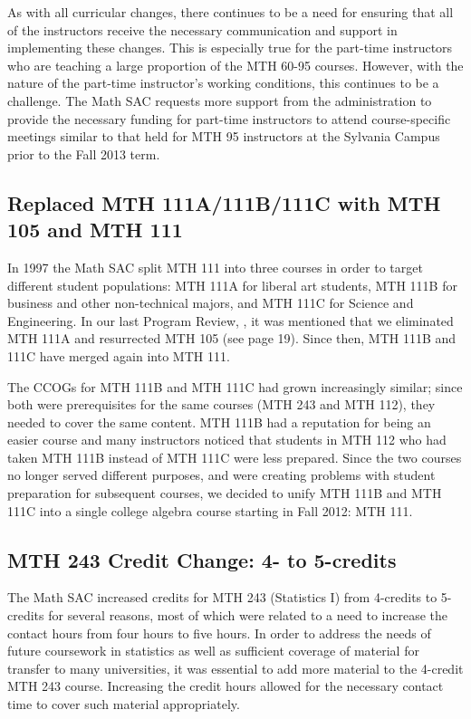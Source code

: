 As with all curricular changes, there continues to be a need for ensuring that
all of the instructors receive the necessary communication and support in
implementing these changes.  This is especially true for the part-time
instructors who are teaching a large proportion of the MTH 60-95 courses.  However,
with the nature of the part-time instructor's working conditions, this continues
to be a challenge.  The Math SAC requests more support from the administration
to provide the necessary funding for part-time instructors to attend
course-specific meetings similar to that held for MTH 95 instructors at the
Sylvania Campus prior to the Fall 2013 term.
 
\subsection{Replaced MTH 111A/111B/111C with MTH 105 and MTH 111}
In 1997 the Math SAC split MTH 111 into three courses in order to target
different student populations: MTH 111A for liberal art students, MTH 111B for
business and other non-technical majors, and MTH 111C for Science and
Engineering.  In our last Program Review, \cite{mathprogramreview2003}, 
it was mentioned that we eliminated MTH 111A and resurrected MTH 105 (see \cite{mathprogramreview2003} page 19).  
Since then, MTH 111B and 111C have merged again into MTH 111.  

The CCOGs for MTH 111B and MTH 111C had grown
increasingly similar; since both were prerequisites for the same courses
(MTH 243 and MTH 112), they needed to cover the same content.  MTH 111B had a
reputation for being an easier course and many instructors noticed that students
in MTH 112 who had taken MTH 111B instead of MTH 111C were less prepared.  Since
the two courses no longer served different purposes, and were creating problems 
with student preparation for subsequent courses, we decided to unify MTH 111B and MTH 111C into a single
college algebra course starting in Fall 2012: MTH 111.
 
\subsection{MTH 243 Credit Change: 4- to 5-credits}\label{other:sec:mth243}
The Math SAC increased credits for MTH 243 (Statistics I) from 4-credits to
5-credits for several reasons, most of which were related to a need to increase
the contact hours from four hours to five hours.  In order to address the needs
of future coursework in statistics as well as sufficient coverage of material
for transfer to many universities, it was essential to add more material to the
4-credit MTH 243 course.  Increasing the credit hours allowed for the necessary
contact time to cover such material appropriately.
 

